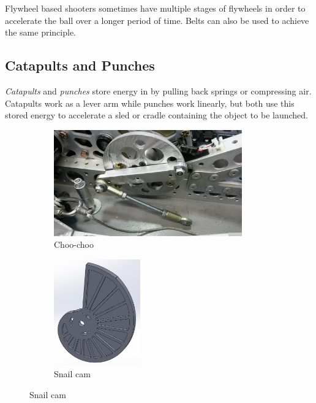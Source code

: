 Flywheel based shooters sometimes have multiple stages of flywheels in order to accelerate the ball over a longer period of time. Belts can also be used to achieve the same principle.

\subsection{Catapults and Punches}
\textit{Catapults} and \textit{punches} store energy in by pulling back springs or compressing air. Catapults work as a lever arm while punches work linearly, but both use this stored energy to accelerate a sled or cradle containing the object to be launched.

\begin{figure}[H]
\begin{subfigure}[b]{.32\linewidth}
	\includegraphics[height=1.8in]{imgs/choo_choo.jpeg}
	\caption{Choo-choo}
\end{subfigure}\begin{subfigure}[b]{.32\linewidth}
	\includegraphics[height=1.8in]{imgs/snail_cam.jpeg}
	\caption{Snail cam}
\end{subfigure}
\end{figure}

